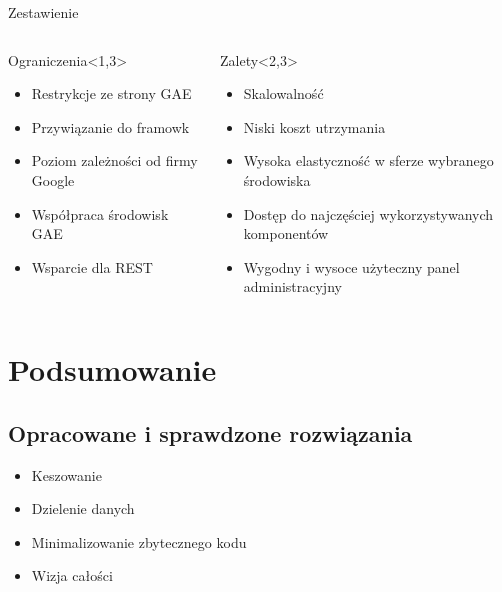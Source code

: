 \documentclass[slitetop]{beamer}
\begin{document}
\begin{frame}{Zestawienie}
\begin{columns}
    \begin{alertblock}{Ograniczenia}<1,3>
    \begin{itemize}
        \item Restrykcje ze strony GAE
        \item Przywiązanie do framowk
        \item Poziom zależności od firmy Google
        \item Współpraca środowisk GAE
        \item Wsparcie dla REST
  \end{itemize}
  \end{alertblock}
    \begin{exampleblock}{Zalety}<2,3>
    \begin{itemize}
        \item Skalowalność
        \item Niski koszt utrzymania 
        \item Wysoka elastyczność w sferze wybranego środowiska 
        \item Dostęp do najczęściej wykorzystywanych komponentów
        \item Wygodny i wysoce użyteczny panel administracyjny
    \end{itemize}
    \end{exampleblock}
\end{columns}
\end{frame}



\section{Podsumowanie}
\subsection{Opracowane i sprawdzone rozwiązania}

\begin{frame}{}
\begin{itemize}
\item{Keszowanie}
\item{Dzielenie danych}
\item{Minimalizowanie zbytecznego kodu}
\item{Wizja całości}
\end{itemize}
\end{frame}
\end{document}
